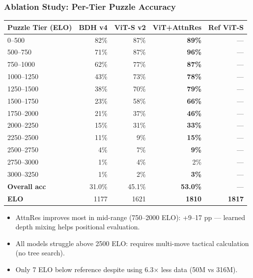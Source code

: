\documentclass{beamer}
\begin{document}
\begin{frame}
\frametitle{Ablation Study: Per-Tier Puzzle Accuracy}

\begin{center}
\footnotesize
\begin{tabular}{lrrrr}
\toprule
\textbf{Puzzle Tier (ELO)} & \textbf{BDH v4} & \textbf{ViT-S v2} & \textbf{ViT+AttnRes} & \textbf{Ref ViT-S} \\
\midrule
0--500     & 82\%  & 87\%  & \textbf{89\%} & --- \\
500--750   & 71\%  & 87\%  & \textbf{96\%} & --- \\
750--1000  & 62\%  & 77\%  & \textbf{87\%} & --- \\
1000--1250 & 43\%  & 73\%  & \textbf{78\%} & --- \\
1250--1500 & 38\%  & 70\%  & \textbf{79\%} & --- \\
1500--1750 & 23\%  & 58\%  & \textbf{66\%} & --- \\
1750--2000 & 21\%  & 37\%  & \textbf{46\%} & --- \\
2000--2250 & 15\%  & 31\%  & \textbf{33\%} & --- \\
2250--2500 & 11\%  & 9\%   & \textbf{15\%} & --- \\
2500--2750 & 4\%   & 7\%   & \textbf{9\%}  & --- \\
2750--3000 & 1\%   & 4\%   & 2\%   & --- \\
3000--3250 & 1\%   & 2\%   & \textbf{3\%}  & --- \\
\midrule
\textbf{Overall acc} & 31.0\% & 45.1\% & \textbf{53.0\%} & --- \\
\textbf{ELO}         & 1177   & 1621   & \textbf{1810}   & \textbf{1817} \\
\bottomrule
\end{tabular}
\end{center}

\vspace{0.3em}
\begin{itemize}
  \item AttnRes improves most in mid-range (750--2000 ELO): +9--17 pp --- learned depth mixing helps positional evaluation.
  \item All models struggle above 2500 ELO: requires multi-move tactical calculation (no tree search).
  \item \alert{Only 7 ELO below reference} despite using 6.3$\times$ less data (50M vs 316M).
\end{itemize}

\end{frame}
\end{document}
